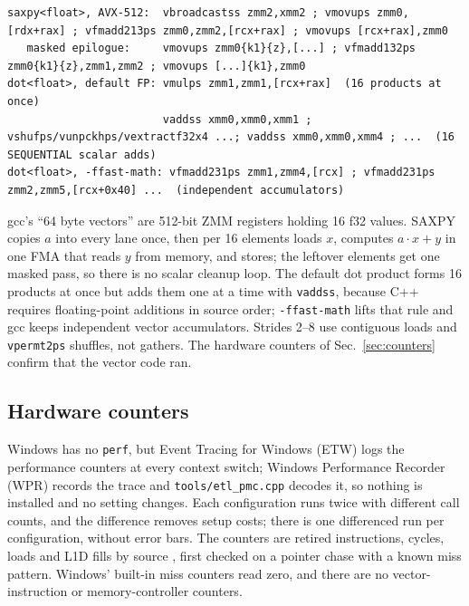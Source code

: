 \documentclass{article}
\begin{document}
\begin{lstlisting}
saxpy<float>, AVX-512:  vbroadcastss zmm2,xmm2 ; vmovups zmm0,[rdx+rax] ; vfmadd213ps zmm0,zmm2,[rcx+rax] ; vmovups [rcx+rax],zmm0
   masked epilogue:     vmovups zmm0{k1}{z},[...] ; vfmadd132ps zmm0{k1}{z},zmm1,zmm2 ; vmovups [...]{k1},zmm0
dot<float>, default FP: vmulps zmm1,zmm1,[rcx+rax]  (16 products at once)
                        vaddss xmm0,xmm0,xmm1 ; vshufps/vunpckhps/vextractf32x4 ...; vaddss xmm0,xmm0,xmm4 ; ...  (16 SEQUENTIAL scalar adds)
dot<float>, -ffast-math: vfmadd231ps zmm1,zmm4,[rcx] ; vfmadd231ps zmm2,zmm5,[rcx+0x40] ...  (independent accumulators)
\end{lstlisting}
gcc's ``64 byte vectors'' are 512-bit ZMM registers holding 16 f32 values. SAXPY copies $a$ into every lane once, then per 16 elements loads $x$, computes $a\cdot x+y$ in one FMA that reads $y$ from memory, and stores; the leftover elements get one masked pass, so there is no scalar cleanup loop. The default dot product forms 16 products at once but adds them one at a time with \texttt{vaddss}, because C++ requires floating-point additions in source order; \texttt{-ffast-math} lifts that rule and gcc keeps independent vector accumulators. Strides 2--8 use contiguous loads and \texttt{vpermt2ps} shuffles, not gathers. The hardware counters of Sec.~\ref{sec:counters} confirm that the vector code ran.

\subsection{Hardware counters}\label{sec:countermethod}
Windows has no \texttt{perf}, but Event Tracing for Windows (ETW) logs the performance counters at every context switch; Windows Performance Recorder (WPR) records the trace and \texttt{tools/etl\_pmc.cpp} decodes it, so nothing is installed and no setting changes. Each configuration runs twice with different call counts, and the difference removes setup costs; there is one differenced run per configuration, without error bars. The counters are retired instructions, cycles, loads and L1D fills by source \cite{perfzen5}, first checked on a pointer chase with a known miss pattern. Windows' built-in miss counters read zero, and there are no vector-instruction or memory-controller counters.
\end{document}
